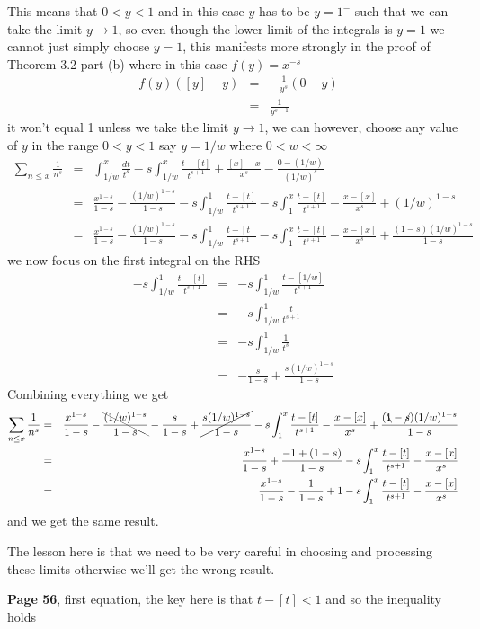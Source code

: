 \documentclass[aps,preprint,preprintnumbers,nofootinbib,showpacs,prd]{revtex4-1}
\newcommand{\nbea}{\begin{eqnarray*}}
\newcommand{\neea}{\end{eqnarray*}}
\begin{document}
This means that $0 < y < 1$ and in this case $y$ has to be $y = 1^{-}$ such that we can take the limit $y \to 1$, so even though the lower limit of the integrals is $y=1$ we cannot just simply choose $y=1$, this manifests more strongly in the proof of Theorem 3.2 part (b) where in this case $f(y) = x^{-s}$
%
\nbea
-f(y)([y]-y) & = & -\frac{1}{y^s} (0 - y) \\
& = & \frac{1}{y^{s-1}}
\neea
%
it won't equal 1 unless we take the limit $y \to 1$, we can however, choose any value of $y$ in the range $0 <y < 1$ say $y = 1/w$ where $0 < w < \infty$
%
\nbea
\sum_{n\le x} \frac{1}{n^s} & = & \int_{1/w}^x \frac{dt}{t^s} - s\int_{1/w}^x\frac{t-[t]}{t^{s+1}} + \frac{[x]-x}{x^s} - \frac{0 - (1/w)}{(1/w)^s} \\
& = & \frac{x^{1-s}}{1-s} - \frac{(1/w)^{1-s}}{1-s} - s\int_{1/w}^1\frac{t-[t]}{t^{s+1}} - s\int_{1}^x\frac{t-[t]}{t^{s+1}} - \frac{x-[x]}{x^s} + (1/w)^{1-s} \\
& = & \frac{x^{1-s}}{1-s} - \frac{(1/w)^{1-s}}{1-s} - s\int_{1/w}^1\frac{t-[t]}{t^{s+1}} - s\int_{1}^x\frac{t-[t]}{t^{s+1}} - \frac{x-[x]}{x^s} + \frac{(1-s)(1/w)^{1-s}}{1-s}
\neea
%
we now focus on the first integral on the RHS
%
\nbea
-s\int_{1/w}^1\frac{t-[t]}{t^{s+1}} & = & -s\int_{1/w}^1\frac{t-[1/w]}{t^{s+1}} \\
& = & -s\int_{1/w}^1\frac{t}{t^{s+1}} \\
& = & -s\int_{1/w}^1\frac{1}{t^{s}} \\
& = & -\frac{s}{1-s} + \frac{s (1/w)^{1-s}}{1-s}
\neea
%
Combining everything we get
%
\nbea
\sum_{n\le x} \frac{1}{n^s} & = & \frac{x^{1-s}}{1-s} - \bcancel{\frac{(1/w)^{1-s}}{1-s}} -\frac{s}{1-s} + \cancel{\frac{s(1/w)^{1-s}}{1-s}} - s\int_{1}^x\frac{t-[t]}{t^{s+1}} - \frac{x-[x]}{x^s} + \frac{(\bcancel{1}-\cancel{s})(1/w)^{1-s}}{1-s} \\
& = & \frac{x^{1-s}}{1-s} +\frac{-1 + (1 - s)}{1-s} - s\int_{1}^x\frac{t-[t]}{t^{s+1}} - \frac{x-[x]}{x^s} \\
& = & \frac{x^{1-s}}{1-s} - \frac{1}{1-s} + 1 - s\int_{1}^x\frac{t-[t]}{t^{s+1}} - \frac{x-[x]}{x^s}
\neea
%
and we get the same result.

The lesson here is that we need to be very careful in choosing and processing these limits otherwise we'll get the wrong result.

{\bf Page 56}, first equation, the key here is that $t-[t] < 1$ and so the inequality holds
\end{document}
